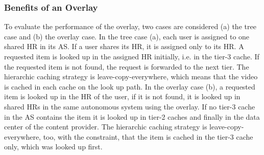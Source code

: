 \subsubsection{Benefits of an Overlay}

To evaluate the performance of the overlay, two cases are considered (a) the tree case and (b) the overlay case. In the tree case (a), each user is assigned to one shared HR in its AS. If a user shares its HR, it is assigned only to its HR. A requested item is looked up in the assigned HR initially, i.e. in the tier-3 cache. If the requested item is not found, the request is forwarded to the next tier. The hierarchic caching strategy is leave-copy-everywhere, which means that the video is cached in each cache on the look up path. In the overlay case (b), a requested item is looked up in the HR of the user, if it is not found, it is looked up in shared HRs in the same autonomous system using the overlay. If no tier-3 cache in the AS contains the item it is looked up in tier-2 caches and finally in the data center of the content provider. The hierarchic caching strategy is leave-copy-everywhere, too, with the constraint, that the item is cached in the tier-3 cache only, which was looked up first.


